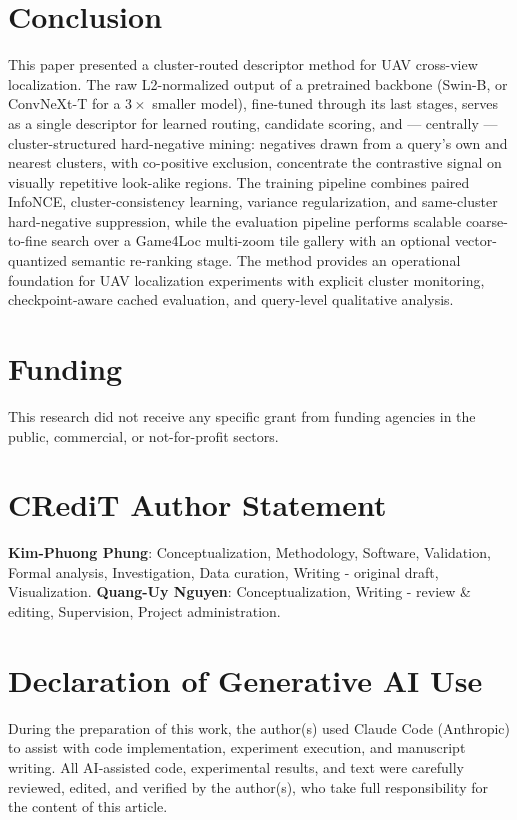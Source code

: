 \documentclass[conference]{IEEEtran}
\begin{document}
\section{Conclusion}
This paper presented a cluster-routed descriptor method for UAV
cross-view localization. The raw L2-normalized output of a pretrained
backbone (Swin-B, or ConvNeXt-T for a $3\times$ smaller model), fine-tuned
through its last stages, serves as a single descriptor for learned routing,
candidate scoring, and — centrally — cluster-structured hard-negative mining:
negatives drawn from a query's own and nearest clusters, with co-positive
exclusion, concentrate the contrastive signal on visually repetitive
look-alike regions. The training pipeline
combines paired InfoNCE, cluster-consistency learning, variance
regularization, and same-cluster hard-negative suppression, while the
evaluation pipeline performs scalable
coarse-to-fine search over a Game4Loc multi-zoom tile gallery with an
optional vector-quantized semantic re-ranking stage. The method provides
an operational foundation for UAV localization experiments with explicit
cluster monitoring, checkpoint-aware cached evaluation,
and query-level qualitative analysis.

\section*{Funding}
This research did not receive any specific grant from funding agencies in
the public, commercial, or not-for-profit sectors.

\section*{CRediT Author Statement}
\textbf{Kim-Phuong Phung}: Conceptualization, Methodology, Software,
Validation, Formal analysis, Investigation, Data curation, Writing -
original draft, Visualization. \textbf{Quang-Uy Nguyen}: Conceptualization,
Writing - review \& editing, Supervision, Project administration.

\section*{Declaration of Generative AI Use}
During the preparation of this work, the author(s) used Claude Code
(Anthropic) to assist with code implementation, experiment execution, and
manuscript writing. All AI-assisted code, experimental results, and text
were carefully reviewed, edited, and verified by the author(s), who take
full responsibility for the content of this article.
\end{document}
